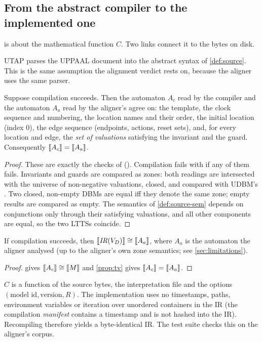 \subsection{From the abstract compiler to the implemented one}

 is about the mathematical function $C$. Two links connect
it to the bytes on disk.

\begin{assumption}\label{ass:utap}
UTAP parses the UPPAAL document into the abstract syntax of
\cref{def:source}. This is the same assumption the alignment verdict rests on,
because the aligner uses the same parser.
\end{assumption}

\begin{proposition}\label{prop:tv}
Suppose compilation succeeds. Then the automaton $A_c$ read by the compiler and
the automaton $A_a$ read by the aligner's  agree on:
the template, the clock sequence and numbering, the location names and their
order, the initial location (index $0$), the edge sequence (endpoints, actions,
reset sets), and, for every location and edge, the \emph{set of valuations}
satisfying the invariant and the guard. Consequently $\llbracket A_c \rrbracket=\llbracket A_a \rrbracket$.
\end{proposition}
\begin{proof}
These are exactly the checks of 
(). Compilation fails with  if any
of them fails. Invariants and guards are compared as zones: both readings are
intersected with the universe of non-negative valuations, closed, and compared
with UDBM's . Two closed, non-empty DBMs are equal iff they
denote the same zone; empty results are compared as empty. The semantics of
\cref{def:source-sem} depends on conjunctions only through their satisfying
valuations, and all other components are equal, so the two LTTSs coincide.
\end{proof}

\begin{corollary}\label{cor:compiled-is-verified}
If compilation succeeds, then $\llbracket \mathit{IR}(V_D) \rrbracket\cong\llbracket A_a \rrbracket$, where $A_a$ is the
automaton the aligner analysed (up to the aligner's own zone semantics; see
\cref{sec:limitations}).
\end{corollary}
\begin{proof}
 gives $\llbracket A_c \rrbracket\cong\llbracket M \rrbracket$ and \cref{prop:tv} gives
$\llbracket A_c \rrbracket=\llbracket A_a \rrbracket$.
\end{proof}

\begin{remark}
$C$ is a function of the source bytes, the interpretation file and the options
$(\text{model id},\text{version},R)$. The implementation uses no timestamps,
paths, environment variables or iteration over unordered containers in the IR
(the compilation \emph{manifest} contains a timestamp and is not hashed into the
IR). Recompiling therefore yields a byte-identical IR. The test suite checks
this on the aligner's corpus.
\end{remark}

